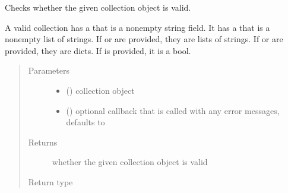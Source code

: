 \documentclass[letterpaper,10pt,english]{sphinxmanual}
\begin{document}

\begin{fulllineitems}
\label{\detokenize{autoapi/pine/client/models/index:pine.client.models.is_valid_eve_collection}}
Checks whether the given collection object is valid.

A valid collection has a  that is a non\sphinxhyphen{}empty string field.  It has a 
that is a non\sphinxhyphen{}empty list of strings.  If  or  are provided, they are
lists of strings.  If  or  are provided, they are dicts.  If
 is provided, it is a bool.
\begin{quote}\begin{description}
\item[{Parameters}] \leavevmode\begin{itemize}
\item {} 
 () \textendash{} collection object

\item {} 
 (\sphinxstyleliteralemphasis{\sphinxupquote{, }}) \textendash{} optional callback that is called with any error messages, defaults to 

\end{itemize}

\item[{Returns}] \leavevmode
whether the given collection object is valid

\item[{Return type}] \leavevmode
{}

\end{description}\end{quote}

\end{fulllineitems}
\end{document}

